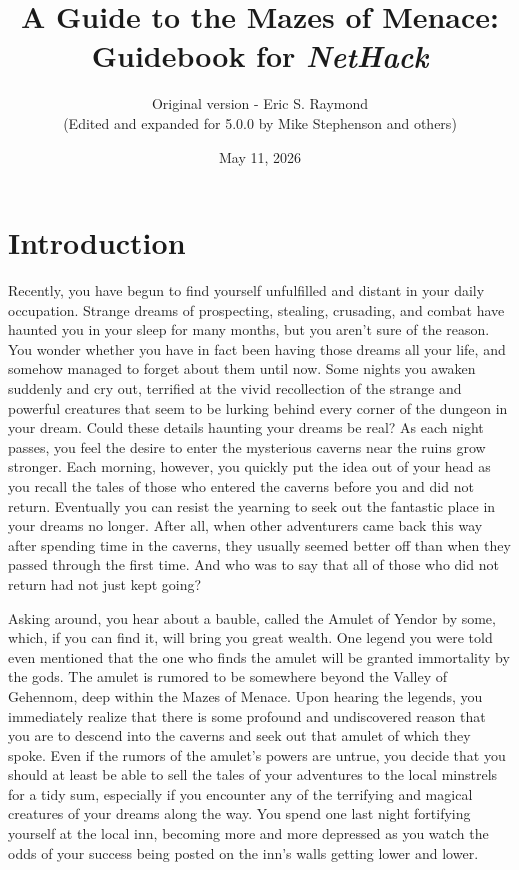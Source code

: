 \documentclass[titlepage]{article}
\begin{document}
%
%

\title{\LARGE A Guide to the Mazes of Menace:\\
\Large Guidebook for \textit{NetHack}}

\author{Original version - Eric S. Raymond\\
(Edited and expanded for 5.0.0 by Mike Stephenson and others)}
\date{May 11, 2026}

\maketitle

\section{Introduction}


Recently, you have begun to find yourself unfulfilled and distant
in your daily occupation.  Strange dreams of prospecting, stealing,
crusading, and combat have haunted you in your sleep for many months,
but you aren't sure of the reason.  You wonder whether you have in
fact been having those dreams all your life, and somehow managed to
forget about them until now.  Some nights you awaken suddenly
and cry out, terrified at the vivid recollection of the strange and
powerful creatures that seem to be lurking behind every corner of the
dungeon in your dream.  Could these details haunting your dreams be real?
As each night passes, you feel the desire to enter the mysterious caverns
near the ruins grow stronger.  Each morning, however, you quickly put
the idea out of your head as you recall the tales of those who entered
the caverns before you and did not return.  Eventually you can resist
the yearning to seek out the fantastic place in your dreams no longer.
After all, when other adventurers came back this way after spending time
in the caverns, they usually seemed better off than when they passed
through the first time.  And who was to say that all of those who did
not return had not just kept going?

Asking around, you hear about a bauble, called the Amulet of Yendor by some,
which, if you can find it, will bring you great wealth.  One legend you were
told even mentioned that the one who finds the amulet will be granted
immortality by the gods.  The amulet is rumored to be somewhere beyond the
Valley of Gehennom, deep within the Mazes of Menace.  Upon hearing the
legends, you immediately realize that there is some profound and
undiscovered reason that you are to descend into the caverns and seek
out that amulet of which they spoke.  Even if the rumors of the amulet's
powers are untrue, you decide that you should at least be able to sell the
tales of your adventures to the local minstrels for a tidy sum, especially
if you encounter any of the terrifying and magical creatures of
your dreams along the way.  You spend one last night fortifying yourself
at the local inn, becoming more and more depressed as you watch the odds
of your success being posted on the inn's walls getting lower and lower.
\end{document}
